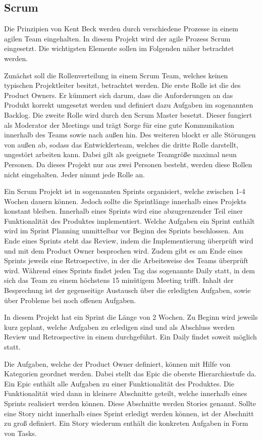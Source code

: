 \subsection{Scrum}
Die Prinzipien von Kent Beck werden durch verschiedene Prozesse in einem agilen Team eingehalten. In diesem Projekt wird der agile Prozess Scrum eingesetzt. Die wichtigsten Elemente sollen im Folgenden näher betrachtet werden.

Zunächst soll die Rollenverteilung in einem Scrum Team, welches keinen typischen Projektleiter besitzt, betrachtet werden. Die erste Rolle ist die des Product Owners. Er kümmert sich darum, dass die Anforderungen an das Produkt korrekt umgesetzt werden und definiert dazu Aufgaben im sogenannten Backlog. Die zweite Rolle wird durch den Scrum Master besetzt. Dieser fungiert als Moderator der Meetings und trägt Sorge für eine gute Kommunikation innerhalb des Teams sowie nach außen hin. Des weiteren blockt er alle Störungen von außen ab, sodass das Entwicklerteam, welches die dritte Rolle darstellt, ungestört arbeiten kann. Dabei gilt als geeignete Teamgröße maximal neun Personen. Da dieses Projekt nur aus zwei Personen besteht, werden diese Rollen nicht eingehalten. Jeder nimmt jede Rolle an.

Ein Scrum Projekt ist in sogenannten Sprints organisiert, welche zwischen 1-4 Wochen dauern können. Jedoch sollte die Sprintlänge innerhalb eines Projekts konstant bleiben. Innerhalb eines Sprints wird eine abzugrenzender Teil einer Funktionalität des Produktes implementiert. Welche Aufgaben ein Sprint enthält wird im Sprint Planning unmittelbar vor Beginn des Sprints beschlossen. Am Ende eines Sprints steht das Review, indem die Implementierung überprüft wird und mit dem Product Owner besprochen wird. Zudem gibt es am Ende eines Sprints jeweils eine Retrospective, in der die Arbeitsweise des Teams überprüft wird. Während eines Sprints findet jeden Tag das sogenannte Daily statt, in dem sich das Team zu einem höchstens 15 minütigem Meeting trifft. Inhalt der Besprechung ist der gegenseitige Austausch über die erledigten Aufgaben, sowie über Probleme bei noch offenen Aufgaben. 

In diesem Projekt hat ein Sprint die Länge von 2 Wochen. Zu Beginn wird jeweils kurz geplant, welche Aufgaben zu erledigen sind und als Abschluss werden Review und Retrospective in einem durchgeführt. Ein Daily findet soweit möglich statt.

Die Aufgaben, welche der Product Owner definiert, können mit Hilfe von Kategorien geordnet werden. Dabei stellt das Epic die oberste Hierarchiestufe da. Ein Epic enthält alle Aufgaben zu einer Funktionalität des Produktes. Die Funktionalität wird dann in kleinere Abschnitte geteilt, welche innerhalb eines Sprints realisiert werden können. Diese Abschnitte werden Stories genannt. Sollte eine Story nicht innerhalb eines Sprint erledigt werden können, ist der Abschnitt zu groß definiert. Ein Story wiederum enthält die konkreten Aufgaben in Form von Tasks.~\cite{F_Scrum_2.1}

